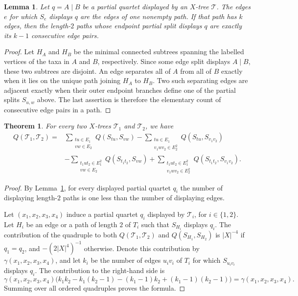 \documentclass[pdflatex,sn-mathphys-num]{sn-jnl}
\theoremstyle{thmstyleone}
\newtheorem{theorem}{Theorem}
\newtheorem{lemma}{Lemma}
\begin{document}
\begin{lemma}\label{lem:display-path}
Let $q=A\mid B$ be a partial quartet displayed by an $X$-tree
$\mathcal T$.  The edges $e$ for which $S_e$ displays $q$ are the edges of
one nonempty path.  If that path has $k$ edges, then the length-$2$ paths
whose endpoint partial split displays $q$ are exactly its $k-1$ consecutive
edge pairs.
\end{lemma}

\begin{proof}
Let $H_A$ and $H_B$ be the minimal connected subtrees spanning the labelled
vertices of the taxa in $A$ and $B$, respectively.  Since some edge split
displays $A\mid B$, these two subtrees are disjoint.  An edge separates all
of $A$ from all of $B$ exactly when it lies on the unique path joining
$H_A$ to $H_B$.  Two such separating edges are adjacent exactly when their
outer endpoint branches define one of the partial splits $S_{u,w}$ above.
The last assertion is therefore the elementary count of consecutive edge
pairs in a path.
\end{proof}

\begin{theorem}\label{thm:inclusion-exclusion}
For every two $X$-trees $\mathcal T_1$ and $\mathcal T_2$, we have
\begin{align*}
Q(\mathcal T_1,\mathcal T_2)
={}&\sum_{\substack{tu\in E_1\\vw\in E_2}}Q(S_{tu},S_{vw})
-\sum_{\substack{tu\in E_1\\v_1wv_2\in E_2^2}}Q(S_{tu},S_{v_1v_2})\\
&-\sum_{\substack{t_1ut_2\in E_1^2\\vw\in E_2}}Q(S_{t_1t_2},S_{vw})
+\sum_{\substack{t_1ut_2\in E_1^2\\v_1wv_2\in E_2^2}}
Q(S_{t_1t_2},S_{v_1v_2}).
\end{align*}
\end{theorem}

\begin{proof}
By Lemma~\ref{lem:display-path}, for every displayed partial quartet $q_i$
the number of displaying length-$2$ paths is one less than the number of
displaying edges.

Let $(x_1,x_2,x_3,x_4)$ induce a partial quartet $q_i$ displayed by
$\mathcal T_i$, for $i\in\{1,2\}$.  Let $H_i$ be an edge or a path of
length $2$ of $T_i$ such that $S_{H_i}$ displays $q_i$.  The contribution
of the quadruple to both $Q(\mathcal T_1,\mathcal T_2)$ and
$Q(S_{H_1},S_{H_2})$ is $|X|^{-4}$ if $q_1=q_2$, and
$-(2|X|^4)^{-1}$ otherwise.  Denote this contribution by
$\gamma(x_1,x_2,x_3,x_4)$, and let $k_i$ be the number of edges $u_iv_i$
of $T_i$ for which $S_{u_iv_i}$ displays $q_i$.  The contribution to the
right-hand side is
\[
\gamma(x_1,x_2,x_3,x_4)
\bigl(k_1k_2-k_1(k_2-1)-(k_1-1)k_2+(k_1-1)(k_2-1)\bigr)
=\gamma(x_1,x_2,x_3,x_4).
\]
Summing over all ordered quadruples proves the formula.
\end{proof}
\end{document}
